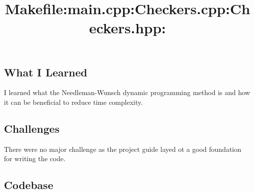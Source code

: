 \subsection{What I Learned}\label{sec:ps5:learned} %

I learned what the Needleman-Wunsch dynamic programming method is and how it can be beneficial to reduce time complexity.

\subsection{Challenges}\label{sec:ps5:challenges} %

There were no major challenge as the project guide layed ot a good foundation for writing the code.

\newpage
\subsection{Codebase}\label{sec:ps5:code} %

\bigskip
\title{\large Makefile:}

\bigskip
\title{\large main.cpp:}

\bigskip
\title{\large Checkers.cpp:}

\bigskip
\title{\large Checkers.hpp:}


\newpage
